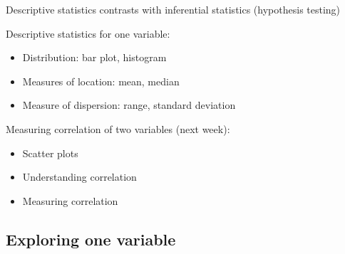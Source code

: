 \documentclass[aspectratio=169,usenames,dvipsnames]{beamer}
\begin{document}
\begin{frame}{Descriptive statistics}
 contrasts with inferential statistics
    (hypothesis testing)

\vspace{1em}
Descriptive statistics for one variable:
\begin{itemize}
    \item Distribution: bar plot, histogram
    \item Measures of location: mean, median
    \item Measure of dispersion: range, standard deviation
\end{itemize}

\pause
Measuring correlation of two variables (next week):
\begin{itemize}
    \item Scatter plots
    \item Understanding correlation
    \item Measuring correlation
\end{itemize}
\end{frame}

\subsection{Exploring one variable}
\frame{\tableofcontents[currentsubsection]}
\end{document}
